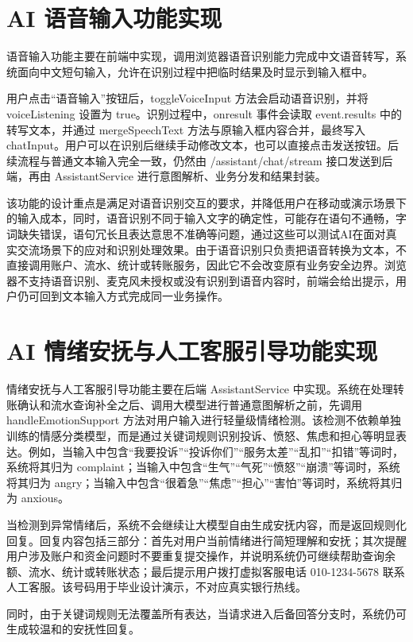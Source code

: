 \documentclass[bachelor, print]{xduthesis}
\begin{document}
\section{AI 语音输入功能实现}

语音输入功能主要在前端中实现，调用浏览器语音识别能力完成中文语音转写，系统面向中文短句输入，允许在识别过程中把临时结果及时显示到输入框中。

用户点击“语音输入”按钮后，toggleVoiceInput 方法会启动语音识别，并将 voiceListening 设置为 true。识别过程中，onresult 事件会读取 event.results 中的转写文本，并通过 mergeSpeechText 方法与原输入框内容合并，最终写入 chatInput。用户可以在识别后继续手动修改文本，也可以直接点击发送按钮。后续流程与普通文本输入完全一致，仍然由 /assistant/chat/stream 接口发送到后端，再由 AssistantService 进行意图解析、业务分发和结果封装。

该功能的设计重点是满足对语音识别交互的要求，并降低用户在移动或演示场景下的输入成本，同时，语音识别不同于输入文字的确定性，可能存在语句不通畅，字词缺失错误，语句冗长且表达意思不准确等问题，通过这些可以测试AI在面对真实交流场景下的应对和识别处理效果。由于语音识别只负责把语音转换为文本，不直接调用账户、流水、统计或转账服务，因此它不会改变原有业务安全边界。浏览器不支持语音识别、麦克风未授权或没有识别到语音内容时，前端会给出提示，用户仍可回到文本输入方式完成同一业务操作。

\section{AI 情绪安抚与人工客服引导功能实现}

情绪安抚与人工客服引导功能主要在后端 AssistantService 中实现。系统在处理转账确认和流水查询补全之后、调用大模型进行普通意图解析之前，先调用 handleEmotionSupport 方法对用户输入进行轻量级情绪检测。该检测不依赖单独训练的情感分类模型，而是通过关键词规则识别投诉、愤怒、焦虑和担心等明显表达。例如，当输入中包含“我要投诉”“投诉你们”“服务太差”“乱扣”“扣错”等词时，系统将其归为 complaint；当输入中包含“生气”“气死”“愤怒”“崩溃”等词时，系统将其归为 angry；当输入中包含“很着急”“焦虑”“担心”“害怕”等词时，系统将其归为 anxious。

当检测到异常情绪后，系统不会继续让大模型自由生成安抚内容，而是返回规则化回复。回复内容包括三部分：首先对用户当前情绪进行简短理解和安抚；其次提醒用户涉及账户和资金问题时不要重复提交操作，并说明系统仍可继续帮助查询余额、流水、统计或转账状态；最后提示用户拨打虚拟客服电话 010-1234-5678 联系人工客服。该号码用于毕业设计演示，不对应真实银行热线。

同时，由于关键词规则无法覆盖所有表达，当请求进入后备回答分支时，系统仍可生成较温和的安抚性回复。
\end{document}
